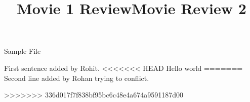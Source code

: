 \documentclass{article}
\begin{document}
\title{Movie 1 Review}


\centerline{\sc \large Sample File}
\vspace{.5pc}
\centerline{\sc }
\vspace{2pc}
\title{Movie Review 2}

First sentence added by Rohit.
<<<<<<< HEAD
Hello world
=======
Second line added by Rohan trying to conflict.

>>>>>>> 336d017f7f838bf95bc6c48e4a674a9591187d00
\end{document}
